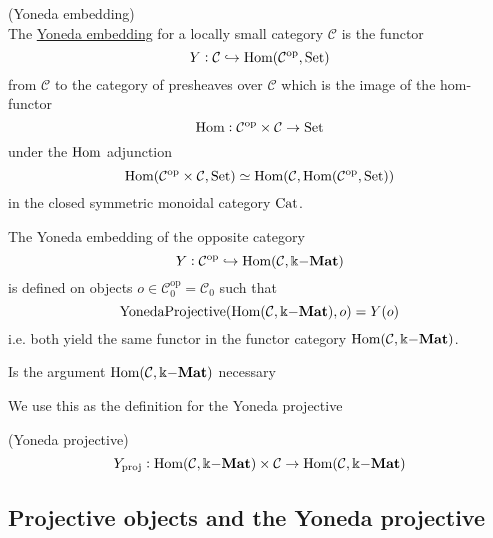 \begin{definition}{(Yoneda embedding)}\label{def:yoneda_embedding}\\
The \ul{Yoneda embedding} for a locally small category $\mathcal{C}$ is the functor
\[
Y : \mathcal{C} \hookrightarrow \textup{Hom}(\mathcal{C}^{\text{op}}, \textup{Set})
\]
from $\mathcal{C}$ to the category of presheaves over $\mathcal{C}$ which is the image of the hom-functor
\[
\textup{Hom} : \mathcal{C}^{\text{op}}\times\mathcal{C} \rightarrow \textup{Set}
\]
under the $\textup{Hom}$ adjunction
\[
\textup{Hom}(\mathcal{C}^{\text{op}}\times\mathcal{C}, \textup{Set}) \simeq
\textup{Hom}(\mathcal{C},\textup{Hom}(\mathcal{C}^{\text{op}}, \textup{Set}))
\]
in the closed symmetric monoidal category $\textup{Cat}$.
\end{definition}

\begin{remark}
The Yoneda embedding of the opposite category
\[
Y : \mathcal{C}^{\text{op}} \hookrightarrow \textup{Hom}(\mathcal{C}, \Bbbk\mathbf{-Mat})
\]
is defined on objects $o \in \mathcal{C}^{\text{op}}_{0} = \mathcal{C}_{0}$ such that
\[
\textup{YonedaProjective}(\textup{Hom}( \mathcal{C}, \Bbbk\mathbf{-Mat} ), o ) = Y(o)
\]
i.e. both yield the same functor in the functor category $\textup{Hom}(\mathcal{C},\Bbbk\mathbf{-Mat})$.
\end{remark}

Is the argument $\textup{Hom}(\mathcal{C},\Bbbk\mathbf{-Mat})$ necessary

We use this as the definition for the Yoneda projective

\begin{definition}{(Yoneda projective)}
\[
Y_{\text{proj}} : \textup{Hom}(\mathcal{C},\Bbbk\mathbf{-Mat})\times \mathcal{C} \rightarrow \textup{Hom}(\mathcal{C},\Bbbk\mathbf{-Mat})
\]
\end{definition}

\subsection{Projective objects and the Yoneda projective}

